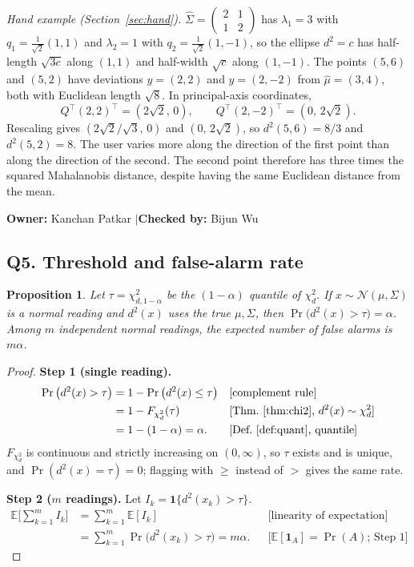 \documentclass[11pt]{article}
\newtheorem{proposition}[theorem]{Proposition}
\theoremstyle{definition}
\newcommand{\T}{^{\top}}
\newcommand{\E}{\mathbb{E}}
\newcommand{\rul}[1]{\text{[#1]}}
\newcommand{\owner}[2]{\par\medskip\noindent\textbf{Owner:} #1 \quad$|$\quad \textbf{Checked by:} #2\par\medskip}
\begin{document}
\textit{Hand example (Section~\ref{sec:hand}).} $\hat\Sigma=\begin{pmatrix}2&1\\1&2\end{pmatrix}$ has $\lambda_1=3$ with $q_1=\tfrac1{\sqrt2}(1,1)$ and $\lambda_2=1$ with $q_2=\tfrac1{\sqrt2}(1,-1)$, so the ellipse $d^2=c$ has half-length $\sqrt{3c}$ along $(1,1)$ and half-width $\sqrt c$ along $(1,-1)$. The points $(5,6)$ and $(5,2)$ have deviations $y=(2,2)$ and $y=(2,-2)$ from $\hat\mu=(3,4)$, both with Euclidean length $\sqrt8$. In principal-axis coordinates,
\[
Q\T(2,2)\T=(2\sqrt2,\,0),\qquad Q\T(2,-2)\T=(0,\,2\sqrt2).
\]
Rescaling gives $(2\sqrt2/\sqrt3,\,0)$ and $(0,\,2\sqrt2)$, so $d^2(5,6)=8/3$ and $d^2(5,2)=8$. The user varies more along the direction of the first point than along the direction of the second. The second point therefore has three times the squared Mahalanobis distance, despite having the same Euclidean distance from the mean.
\owner{Kanchan Patkar}{Bijun Wu}

\subsection*{Q5. Threshold and false-alarm rate}
\begin{proposition}\label{prop:far}
Let $\tau=\chi^2_{d,1-\alpha}$ be the $(1-\alpha)$ quantile of $\chi^2_d$. If $x\sim\mathcal N(\mu,\Sigma)$ is a normal reading and $d^2(x)$ uses the true $\mu,\Sigma$, then $\Pr\big(d^2(x)>\tau\big)=\alpha$. Among $m$ independent normal readings, the expected number of false alarms is $m\alpha$.
\end{proposition}

\begin{proof}
\textbf{Step 1 (single reading).}
\begin{align*}
\Pr\big(d^2(x)>\tau\big) &= 1-\Pr\big(d^2(x)\le\tau\big) && \rul{complement rule}\\
&= 1-F_{\chi^2_d}(\tau) && \rul{Thm.~\ref{thm:chi2}, $d^2(x)\sim\chi^2_d$}\\
&= 1-(1-\alpha)=\alpha. && \rul{Def.~\ref{def:quant}, quantile}
\end{align*}
$F_{\chi^2_d}$ is continuous and strictly increasing on $(0,\infty)$, so $\tau$ exists and is unique, and $\Pr(d^2(x)=\tau)=0$; flagging with $\ge$ instead of $>$ gives the same rate.

\textbf{Step 2 ($m$ readings).} Let $I_k=\mathbf 1\{d^2(x_k)>\tau\}$.
\begin{align*}
\E\Big[\sum_{k=1}^m I_k\Big] &= \sum_{k=1}^m\E[I_k] && \rul{linearity of expectation}\\
&= \sum_{k=1}^m\Pr\big(d^2(x_k)>\tau\big)=m\alpha. && \rul{$\E[\mathbf 1_A]=\Pr(A)$; Step 1}
\end{align*}
\end{proof}
\end{document}
